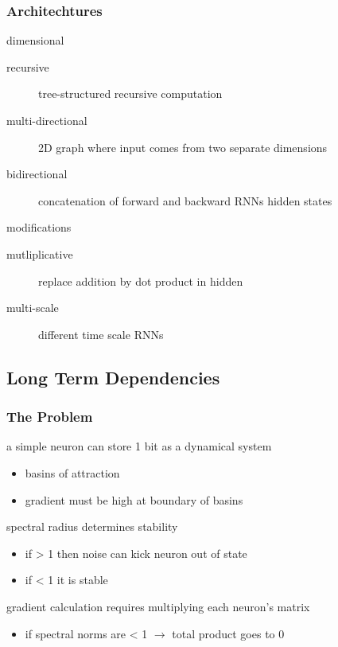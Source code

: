 \documentclass[]{article}
\theoremstyle{definition}
\begin{document}
    \subsubsection{Architechtures}%
    \label{ssub:architechtures}

    dimensional
    \begin{description}
        \item[recursive] tree-structured recursive computation
        \item[multi-directional] 2D graph where input comes from two separate dimensions
        \item[bidirectional] concatenation of forward and backward RNNs hidden states
    \end{description}

    modifications
    \begin{description}
        \item[mutliplicative] replace addition by dot product in hidden
        \item[multi-scale] different time scale RNNs
    \end{description}

    \subsection{Long Term Dependencies}%
    \label{sub:long_term_dependencies}

    \subsubsection{The Problem}%
    \label{ssub:the_problem}

    a simple neuron can store 1 bit as a dynamical system
    \begin{itemize}
        \item basins of attraction
        \item gradient must be high at boundary of basins
    \end{itemize}
    spectral radius determines stability
    \begin{itemize}
        \item if > 1 then noise can kick neuron out of state
        \item if < 1 it is stable
    \end{itemize}
    gradient calculation requires multiplying each neuron's matrix
    \begin{itemize}
        \item if spectral norms are < 1 $\to$ total product goes to 0
    \end{itemize}
\end{document}
